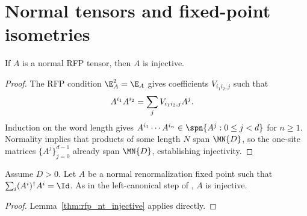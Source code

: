\section{Normal tensors and fixed-point isometries}

\begin{lemma}\label{thm:rfp_nt_injective}
    \leanok
    If $A$ is a normal RFP tensor, then $A$ is injective.
\end{lemma}
\begin{proof}\leanok
    The RFP condition $\E_A^2=\E_A$ gives coefficients $V_{i_1i_2,j}$
    such that
    \begin{align}
        A^{i_1}A^{i_2}
         & =\sum_j V_{i_1i_2,j}A^j.
        \notag
    \end{align}
    Induction on the word length gives
    $A^{i_1}\cdots A^{i_n}\in\spn\{A^j:0\le j<d\}$ for $n\ge 1$.
    Normality implies that products of some length $N$ span $\MN{D}$, so
    the one-site matrices $\{A^j\}_{j=0}^{d-1}$ already span $\MN{D}$,
    establishing injectivity.
\end{proof}

\begin{lemma}%
    \label{thm:rfp_nt_structural_of_left_canonical}
    \leanok
    Assume $D > 0$. Let $A$ be a normal renormalization fixed point such that
    $\sum_i (A^i)^\dagger A^i = \Id$.
    As in the left-canonical step of \cite[Appendix~B]{Cirac2016MPDO_arXiv},
    $A$ is injective.
\end{lemma}
\begin{proof}\leanok
    Lemma~\ref{thm:rfp_nt_injective} applies directly.
\end{proof}

